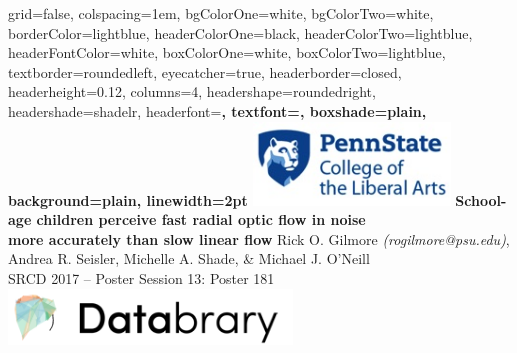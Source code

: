 \documentclass[landscape,final,paperwidth=60in,paperheight=39in,fontscale=0.285]{baposter}
\begin{document}



\begin{poster}%
  {
  grid=false,
  colspacing=1em,
  bgColorOne=white,
  bgColorTwo=white,
  borderColor=lightblue,
  headerColorOne=black,
  headerColorTwo=lightblue,
  headerFontColor=white,
  boxColorOne=white,
  boxColorTwo=lightblue,
  textborder=roundedleft,
  eyecatcher=true,
  headerborder=closed,
  headerheight=0.12\textheight,
  columns=4, %
  headershape=roundedright,
  headershade=shadelr,
  headerfont=\Large\bf\textsc, %
  textfont={\setlength{\parindent}{1.5em}},
  boxshade=plain,
  background=plain,
  linewidth=2pt
  }
  {\includegraphics[height=6em]{penn_state_cla_logo_new_210-89.jpg}}
  {\bf{School-age children perceive fast radial optic flow in noise\\more accurately than slow linear flow} 
  \vspace{0.3em}}
  {Rick O. Gilmore \emph{(rogilmore@psu.edu)}, Andrea R. Seisler, Michelle A. Shade, \& Michael J. O'Neill\\ \vspace{0.3em}
  SRCD 2017 -- Poster Session 13: Poster 181}
 {\includegraphics[height=4em]{databrary.png}}


\end{poster}
\end{document}
